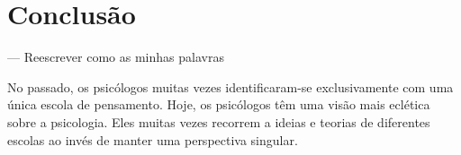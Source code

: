 \newpage
\section{Conclusão}\label{conclusao}


--- Reescrever como as minhas palavras

No passado, os psicólogos muitas vezes identificaram-se exclusivamente com uma única escola de pensamento. Hoje, os psicólogos têm uma visão mais eclética sobre a psicologia. Eles muitas vezes recorrem a ideias e teorias de diferentes escolas ao invés de manter uma perspectiva singular.